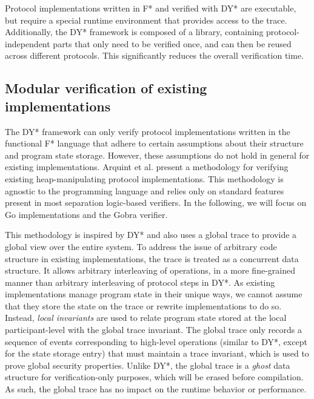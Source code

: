 \documentclass{article}
\begin{document}
Protocol implementations written in F* and verified with DY* are executable, but require a special runtime environment that provides access to the trace. Additionally, the DY* framework is composed of a library, containing protocol-independent parts that only need to be verified once, and can then be reused across different protocols. This significantly reduces the overall verification time.

\subsection{Modular verification of existing implementations}

The DY* framework can only verify protocol implementations written in the functional F* language that adhere to certain assumptions about their structure and program state storage.
However, these assumptions do not hold in general for existing implementations.
Arquint et al.\cite{arquint2022generic} present a methodology for verifying existing heap-manipulating protocol implementations. This methodology is agnostic to the programming language and relies only on standard features present in most separation logic-based verifiers. In the following, we will focus on Go implementations and the Gobra\cite{wolf2021gobra} verifier.

This methodology is inspired by DY* and also uses a global trace to provide a global view over the entire system.
To address the issue of arbitrary code structure in existing implementations, the trace is treated as a concurrent data structure. It allows arbitrary interleaving of operations, in a more fine-grained manner than arbitrary interleaving of protocol steps in DY*.
As existing implementations manage program state in their unique ways, we cannot assume that they store the state on the trace or rewrite implementations to do so. Instead, \emph{local invariants} are used to relate program state stored at the local participant-level with the global trace invariant.
The global trace only records a sequence of events corresponding to high-level operations (similar to DY*, except for the state storage entry) that must maintain a trace invariant, which is used to prove global security properties.
Unlike DY*, the global trace is a \emph{ghost} data structure for verification-only purposes, which will be erased before compilation. As such, the global trace has no impact on the runtime behavior or performance.
\end{document}
